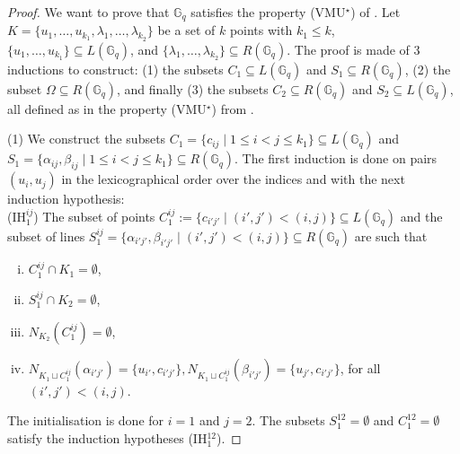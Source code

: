 \documentclass[a4paper,UKenglish,cleveref, autoref, thm-restate]{arxiv}
\newcommand{\ls}{\leqslant}
\newcommand{\G}[1][q]{\mathbb{G}_{#1}}
\begin{document}
    \begin{proof}
        We want to prove that $\G$ satisfies the property (VMU$^\star$) of . Let $K= \{u_1, \ldots, u_{k_1}, \lambda_1, \ldots, \lambda_{k_2}\}$ be a set of $k$ points with $k_1\ls k$, $\{u_1, \ldots, u_{k_1}\} \subseteq L(\G)$, and $\{\lambda_1, \ldots, \lambda_{k_2}\} \subseteq R(\G)$. The proof is made of 3 inductions to construct: (1) the subsets $C_1 \subseteq L(\G)$ and $S_1\subseteq R(\G) $, (2) the subset $\Omega \subseteq R(\G)$, and finally (3) the subsets $C_2 \subseteq R(\G)$ and $S_2\subseteq L(\G)$, all defined as in the property (VMU$^\star$) from .

        (1) We construct the subsets $C_1 = \{c_{ij}\mid 1 \ls i<j \ls k_1\} \subseteq L(\G)$ and $S_1 = \{\alpha_{ij}, \beta_{ij} \mid 1 \ls i<j \ls k_1 \}\subseteq R(\G)$. The first induction is done on pairs $(u_i, u_j)$ in the lexicographical order over the indices and with the next induction hypothesis:\\

        (IH$_1^{ij}$) The subset of points $C_1^{ij} := \{c_{i'j'}\mid (i',j')<(i, j)\} \subseteq L(\G)$ and the subset of lines $S_1^{ij} = \{\alpha_{i'j'}, \beta_{i'j'}\mid (i', j') < (i,j) \}\subseteq R(\G)$ are such that
        \begin{enumerate}[(i)]
            \item $C_1^{ij} \cap K_1 = \emptyset$,
            \item $S_1^{ij} \cap K_2 = \emptyset$,
            \item $N_{K_2}(C_1^{ij})= \emptyset$,
            \item $N_{K_1 \sqcup C_1^{ij}}(\alpha_{i'j'}) = \{u_{i'}, c_{i'j'}\}, N_{K_1 \sqcup C_1^{ij}}(\beta_{i'j'}) = \{u_{j'}, c_{i'j'}\}$, for all $(i', j')<(i,j)$.
        \end{enumerate}

        The initialisation is done for $i=1$ and $j=2$. The subsets $S_1^{12} = \emptyset$ and $C_1^{12}=\emptyset$ satisfy the induction hypotheses (IH$_1^{12}$). 
        

\end{proof}
\end{document}

